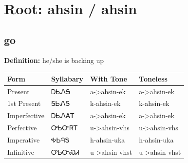 \documentclass{article}%
\begin{document}
%
\normalsize%
\section*{Root: ahsin / ahsin}%
\subsection*{go}%
\textbf{Definition: }%
he/she is backing up%
\\[0.5em]%
\begin{tabular}{|l|l|l|l|}%
\hline%
\textbf{Form}&\textbf{Syllabary}&\textbf{With Tone}&\textbf{Toneless}\\%
\hline%
Present&ᎠᏏᏁᎦ&a{-}>ahsin{-}ek&a{-}>ahsin{-}ek\\%
1st Present&ᎦᏏᏁᎦ&k{-}ahsin{-}ek&k{-}ahsin{-}ek\\%
Imperfective&ᎠᏏᏁᎪᎢ&a{-}>ahsin{-}ek&a{-}>ahsin{-}ek\\%
Perfective&ᎤᏏᏅᏒᎢ&u{-}>ahsin{-}vhs&u{-}>ahsin{-}vhs\\%
Imperative&ᎭᏏᏄᎦ&h{-}ahsin{-}uka&h{-}ahsin{-}uka\\%
Infinitive&ᎤᏏᏅᏍᏗ&u{-}>ahsin{-}vhst&u{-}>ahsin{-}vhst\\%
\hline%
\end{tabular}%
\\[1em]%
\end{document}
